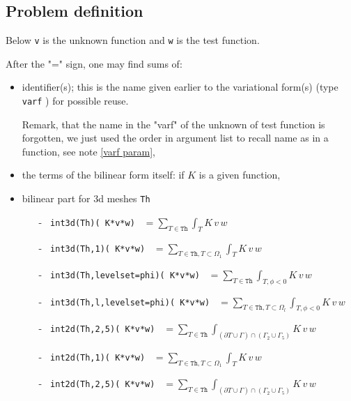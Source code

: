 \documentclass[a4paper,twoside,12pt]{book}
\def\p{\partial}
\begin{document}
\subsection{Problem definition}

Below  \texttt{v} is the unknown function and \texttt{w} is the test function.

  After the "=" sign, one may find sums of:

\begin{itemize}
    \item identifier(s); this is the name given earlier to the
     variational form(s) (type \texttt{varf} ) for possible reuse.

      Remark, that the
     name in the "varf" of the unknown of  test function is forgotten, we just used the order in argument
     list to recall name as in a \Cpp function, see  note \ref{varf param},
    \item  the terms of the bilinear form itself: if $K$ is a  given function,
    \item  bilinear part for 3d meshes \texttt{Th}
     \begin{itemize}
       \item[-]   \texttt{ int3d(Th)( K*v*w) } $ \displaystyle = \sum_{T\in\mathtt{Th}}\int_{T } K\,v\,w  $ 
       \item[-]   \texttt{ int3d(Th,1)( K*v*w) } $ \displaystyle = \sum_{T\in\mathtt{Th},T\subset \Omega_{1}}\int_{T} K\,v\,w  $ 
       \item[-]  \texttt{ int3d(Th,levelset=phi)( K*v*w) } $ \displaystyle = \sum_{T\in\mathtt{Th}}\int_{T,\phi<0} K\,v\,w  $ 
       \item[-]  \texttt{ int3d(Th,l,levelset=phi)( K*v*w) } $ \displaystyle = \sum_{T\in\mathtt{Th},T\subset \Omega_{l}}\int_{T,\phi<0} K\,v\,w  $ 

        \item[-] \texttt{ int2d(Th,2,5)( K*v*w) }  $ \displaystyle = \sum_{T\in\mathtt{Th}}\int_{(\p T\cup\Gamma) \cap ( \Gamma_2 \cup \Gamma_{5})
          } K\,v\,w  $ 
       \item[-]  \texttt{ int2d(Th,1)( K*v*w) } $ \displaystyle = \sum_{T\in\mathtt{Th},T\subset \Omega_{1}}\int_{T} K\,v\,w  $ 
        \item[-] \texttt{ int2d(Th,2,5)( K*v*w) }  $ \displaystyle = \sum_{T\in\mathtt{Th}}\int_{(\p T\cup\Gamma) \cap ( \Gamma_2 \cup \Gamma_{5})
          } K\,v\,w  $ 


\end{itemize}
\end{itemize}
\end{document}
